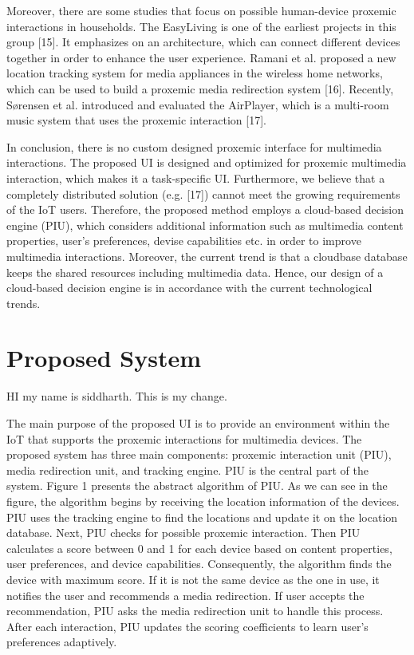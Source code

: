 \documentclass[]{IEEEphot}
\begin{document}
Moreover, there are some studies that focus on possible human-device proxemic interactions in households. The EasyLiving is one of the earliest projects
in this group [15]. It emphasizes on an architecture, which can connect different
devices together in order to enhance the user experience. Ramani et al. proposed
a new location tracking system for media appliances in the wireless home networks, which can be used to build a proxemic media redirection system [16].
Recently, Sørensen et al. introduced and evaluated the AirPlayer, which is a
multi-room music system that uses the proxemic interaction [17].



In conclusion, there is no custom designed proxemic interface for multimedia
interactions. The proposed UI is designed and optimized for proxemic multimedia interaction, which makes it a task-specific UI. Furthermore, we believe that
a completely distributed solution (e.g. [17]) cannot meet the growing requirements of the IoT users. Therefore, the proposed method employs a cloud-based
decision engine (PIU), which considers additional information such as multimedia content properties, user’s preferences, devise capabilities etc. in order to
improve multimedia interactions. Moreover, the current trend is that a cloudbase database keeps the shared resources including multimedia data. Hence, our
design of a cloud-based decision engine is in accordance with the current technological trends.

\section{ Proposed System}
HI my name is siddharth. This is my change.



The main purpose of the proposed UI is to provide an environment within the
IoT that supports the proxemic interactions for multimedia devices. The proposed system has three main components: proxemic interaction unit (PIU), media redirection unit, and tracking engine. PIU is the central part of the system.
Figure 1 presents the abstract algorithm of PIU. As we can see in the figure, the
algorithm begins by receiving the location information of the devices. PIU uses
the tracking engine to find the locations and update it on the location database.
Next, PIU checks for possible proxemic interaction. Then PIU calculates a score
between 0 and 1 for each device based on content properties, user preferences,
and device capabilities. Consequently, the algorithm finds the device with maximum score. If it is not the same device as the one in use, it notifies the user and
recommends a media redirection. If user accepts the recommendation, PIU asks
the media redirection unit to handle this process. After each interaction, PIU
updates the scoring coefficients to learn user’s preferences adaptively.
\end{document}
